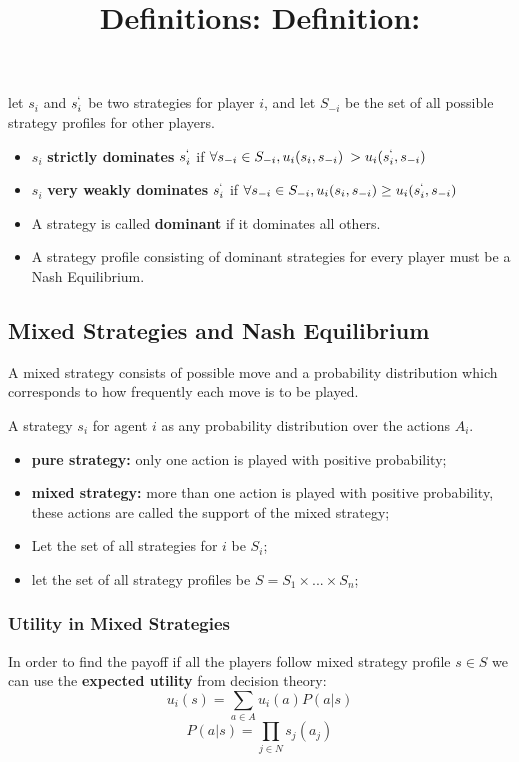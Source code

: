 \paragraph{}
let $s_i$ and $s_i^`$ be two strategies for player $i$, and let $S_{-i}$ be the set of all possible strategy profiles for other players.
\bigbreak
\title{\textbf{Definitions:} }
\begin{itemize}
\item $s_i$ \textbf{strictly dominates} $s_i^`$ if $\forall s_{-i} \in S_{-i}, u_i(s_i, s_{-i}) \>> u_i(s_i^`, s_{-i})$
\item $s_i$ \textbf{very weakly dominates} $s_i^`$ if $\forall s_{-i} \in S_{-i}, u_i(s_i, s_{-i}) \geq u_i(s_i^`, s_{-i})$
\item A strategy is called \textbf{dominant} if it dominates all others.
\item A strategy profile consisting of dominant strategies for every player must be a Nash Equilibrium.
\end{itemize}

\subsection{Mixed Strategies and Nash Equilibrium}
A mixed strategy consists of possible move and a probability distribution which corresponds to how frequently each move is to be played.
\title{\textbf{Definition:}}
A strategy $s_i$ for agent $i$ as any probability distribution over the actions $A_i$.
\begin{itemize}
\item \textbf{pure strategy:} only one action is played with positive probability;
\item \textbf{mixed strategy:} more than one action is played with positive probability, these actions are called the support of the mixed strategy;
\item Let the set of all strategies for $i$ be $S_i$;
\item let the set of all strategy profiles be $S = S_1 \times... \times S_n$;
\end{itemize}

\subsubsection{Utility in Mixed Strategies}
In order to find the payoff if all the players follow mixed strategy profile $s \in S$ we can use the \textbf{expected utility} from decision theory: 
\begin{equation} \label{eq:112}
u_i(s) = \sum_{a \in A}u_i(a)P(a|s)
\end{equation}
\begin{equation} 
P(a|s) = \prod_{j \in N}s_j(a_j)
\end{equation}
